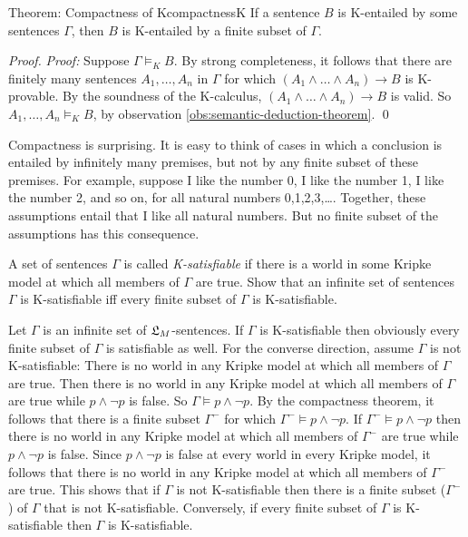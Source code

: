 \begin{theorem}{Theorem: Compactness of K}{compactnessK}
  If a sentence $B$ is K-entailed by some sentences $\Gamma$, then $B$ is
  K-entailed by a finite subset of $\Gamma$.
\end{theorem}
\begin{proof}
  \emph{Proof:} Suppose $\Gamma \models_{K} B$. By strong completeness, it
  follows that there are finitely many sentences $A_{1},\ldots,A_{n}$ in
  $\Gamma$ for which $(A_{1}\land\ldots\land A_{n}) \to B$ is K-provable. By the
  soundness of the K-calculus, $(A_{1}\land\ldots\land A_{n}) \to B$ is valid.
  So $A_{1},\ldots,A_{n} \models_{K} B$, by observation
  \ref{obs:semantic-deduction-theorem}. \qed
\end{proof}

Compactness is surprising. It is easy to think of cases in which a conclusion is
entailed by infinitely many premises, but not by any finite subset of these
premises. For example, suppose I like the number 0, I like the number 1, I like
the number 2, and so on, for all natural numbers 0,1,2,3,\ldots. Together, these
assumptions entail that I like all natural numbers. But no finite subset of the
assumptions has this consequence. 

\begin{exercise}
  A set of sentences $\Gamma$ is called \emph{K-satisfiable} if there is a world
  in some Kripke model at which all members of $\Gamma$ are true. Show that an
  infinite set of sentences $\Gamma$ is K-satisfiable iff every finite subset of
  $\Gamma$ is K-satisfiable.
\end{exercise}
\begin{solution}
  Let $\Gamma$ is an infinite set of $\mathfrak{L}_{M}$-sentences. If $\Gamma$ is
  K-satisfiable then obviously every finite subset of $\Gamma$ is satisfiable as
  well. For the converse direction, assume $\Gamma$ is not K-satisfiable: There
  is no world in any Kripke model at which all members of $\Gamma$ are true.
  Then there is no world in any Kripke model at which all members of $\Gamma$
  are true while $p \land \neg p$ is false. So $\Gamma \models p\land \neg p$.
  By the compactness theorem, it follows that there is a finite subset
  $\Gamma^{-}$ for which $\Gamma^{-} \models p \land \neg p$. If
  $\Gamma^{-} \models p \land \neg p$ then there is no world in any Kripke model
  at which all members of $\Gamma^{-}$ are true while $p \land \neg p$ is false.
  Since $p\land \neg p$ is false at every world in every Kripke model, it
  follows that there is no world in any Kripke model at which all members of
  $\Gamma^{-}$ are true. This shows that if $\Gamma$ is not K-satisfiable then
  there is a finite subset ($\Gamma^{-}$) of $\Gamma$ that is not K-satisfiable.
  Conversely, if every finite subset of $\Gamma$ is K-satisfiable then $\Gamma$
  is K-satisfiable.
\end{solution}

